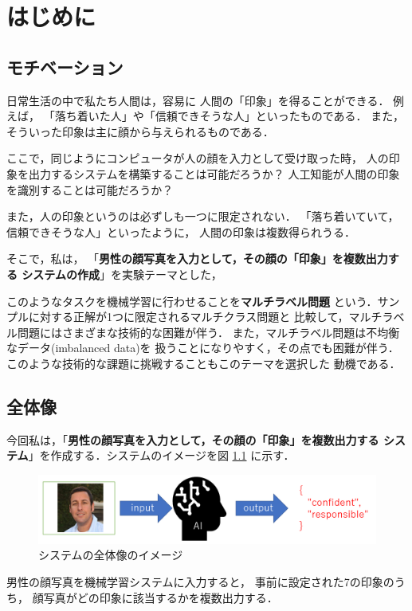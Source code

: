 \chapter{はじめに}
\section{モチベーション}
日常生活の中で私たち人間は，容易に
人間の「印象」を得ることができる．
例えば，
「落ち着いた人」や「信頼できそうな人」といったものである．
また，そういった印象は主に顔から与えられるものである．

ここで，同じようにコンピュータが人の顔を入力として受け取った時，
人の印象を出力するシステムを構築することは可能だろうか？
人工知能が人間の印象を識別することは可能だろうか？

また，人の印象というのは必ずしも一つに限定されない．
「落ち着いていて，信頼できそうな人」といったように，
人間の印象は複数得られうる．

そこで，私は，
「{\bf 男性の顔写真を入力として，その顔の「印象」を複数出力する
システムの作成}」を実験テーマとした，

このようなタスクを機械学習に行わせることを{\bf マルチラベル問題}
という．サンプルに対する正解が1つに限定されるマルチクラス問題と
比較して，マルチラベル問題にはさまざまな技術的な困難が伴う．
また，マルチラベル問題は不均衡なデータ(imbalanced data)を
扱うことになりやすく，その点でも困難が伴う．
このような技術的な課題に挑戦することもこのテーマを選択した
動機である．
\section{全体像}
今回私は，「{\bf 男性の顔写真を入力として，その顔の「印象」を複数出力する
システム}」を作成する．システムのイメージを図
\ref{fig:ch1:system}
に示す．

\begin{figure}[tb]
  \centering
  \includegraphics[width=13cm]{ch1/system.png}
  \caption{
  システムの全体像のイメージ
  \label{fig:ch1:system}
  }
\end{figure}

男性の顔写真を機械学習システムに入力すると，
事前に設定された7の印象のうち，
顔写真がどの印象に該当するかを複数出力する．


